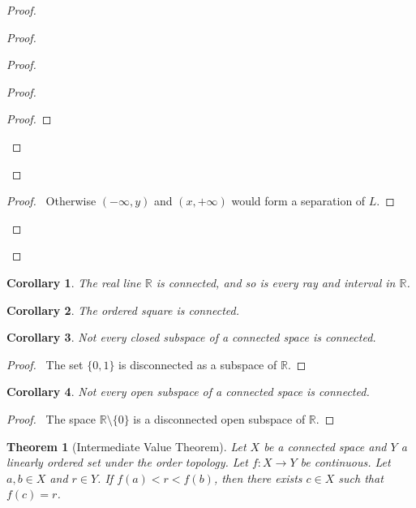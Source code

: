 \documentclass{report}
\let\qed\relax
\newtheorem{thm}[lm]{Theorem}
\newtheorem{cor}{Corollary}[lm]
\theoremstyle{definition}
\begin{document}
\begin{proof}
\begin{proof}
\begin{proof}
\begin{proof}
        \begin{proof}
        \end{proof}
      \end{proof}
    \end{proof}
    \begin{proof}
      \pf\ Otherwise $(-\infty, y)$ and $(x, +\infty)$ would form a separation
      of $L$.
    \end{proof}
  \end{proof}
    \qed
  \end{proof}

  \begin{cor}
    \label{cor:connected:real}
    The real line $\mathbb{R}$ is connected, and so is every ray and interval
    in $\mathbb{R}$.
  \end{cor}

  \begin{cor}
    The ordered square is connected.
  \end{cor}

\begin{cor}
  Not every closed subspace of a connected space is connected.
\end{cor}

\begin{proof}
  \pf\ The set $\{0,1\}$ is disconnected as a subspace of $\mathbb{R}$.
\end{proof}

\begin{cor}
  Not every open subspace of a connected space is connected.
\end{cor}

\begin{proof}
  \pf\ The space $\mathbb{R} \setminus \{ 0 \}$ is a disconnected open subspace of $\mathbb{R}$.
  \qed
\end{proof}

  \begin{thm}[Intermediate Value Theorem]
    Let $X$ be a connected space and $Y$ a linearly ordered set under the order
    topology. Let $f : X \rightarrow Y$ be continuous. Let $a, b \in X$ and $r
    \in Y$. If $f(a) < r < f(b)$, then there exists $c \in X$ such that $f(c) =
    r$.
  \end{thm}
\end{document}
